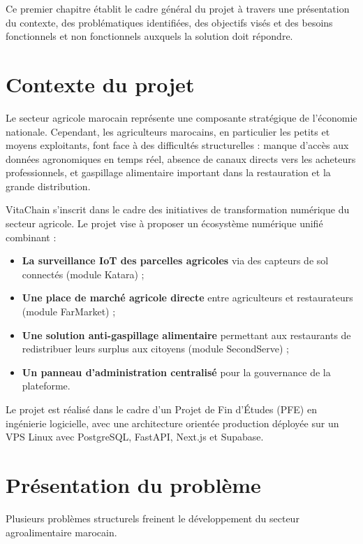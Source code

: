 \documentclass[12pt,a4paper]{report}
\begin{document}
Ce premier chapitre établit le cadre général du projet à travers une présentation du
contexte, des problématiques identifiées, des objectifs visés et des besoins fonctionnels
et non fonctionnels auxquels la solution doit répondre.

\section{Contexte du projet}

Le secteur agricole marocain représente une composante stratégique de l'économie nationale.
Cependant, les agriculteurs marocains, en particulier les petits et moyens exploitants,
font face à des difficultés structurelles : manque d'accès aux données agronomiques en
temps réel, absence de canaux directs vers les acheteurs professionnels, et gaspillage
alimentaire important dans la restauration et la grande distribution.

VitaChain s'inscrit dans le cadre des initiatives de transformation numérique du secteur
agricole. Le projet vise à proposer un écosystème numérique unifié combinant :

\begin{itemize}
  \item \textbf{La surveillance IoT des parcelles agricoles} via des capteurs de sol
        connectés (module Katara) ;
  \item \textbf{Une place de marché agricole directe} entre agriculteurs et restaurateurs
        (module FarMarket) ;
  \item \textbf{Une solution anti-gaspillage alimentaire} permettant aux restaurants de
        redistribuer leurs surplus aux citoyens (module SecondServe) ;
  \item \textbf{Un panneau d'administration centralisé} pour la gouvernance de la
        plateforme.
\end{itemize}

Le projet est réalisé dans le cadre d'un Projet de Fin d'Études (PFE) en ingénierie
logicielle, avec une architecture orientée production déployée sur un VPS Linux avec
PostgreSQL, FastAPI, Next.js et Supabase.

\section{Présentation du problème}

Plusieurs problèmes structurels freinent le développement du secteur agroalimentaire
marocain.
\end{document}
